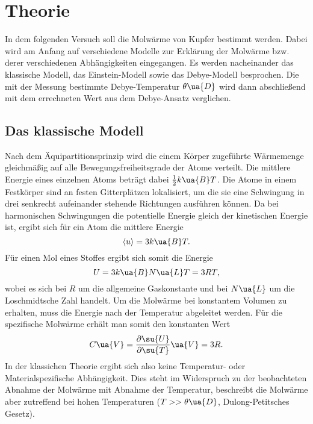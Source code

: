 \section{Theorie}

In dem folgenden Versuch soll die Molwärme von Kupfer bestimmt werden. Dabei wird
am Anfang auf verschiedene Modelle zur Erklärung der Molwärme bzw. derer verschiedenen
Abhängigkeiten eingegangen. Es werden nacheinander das klassische Modell, das Einstein-Modell
sowie das Debye-Modell besprochen. Die mit der Messung bestimmte Debye-Temperatur
$\theta\ua{D}$ wird dann abschließend mit dem errechneten Wert aus dem Debye-Ansatz
verglichen.

\subsection{Das klassische Modell}

Nach dem Äquipartitionsprinzip wird die einem Körper zugeführte Wärmemenge
gleichmäßig auf alle Bewegungsfreiheitsgrade der Atome verteilt. Die mittlere
Energie eines einzelnen Atoms beträgt dabei $\frac{1}{2}k\ua{B}T$. Die Atome in
einem Festkörper sind an festen Gitterplätzen lokalisiert, um die sie eine Schwingung
in drei senkrecht aufeinander stehende Richtungen ausführen können. Da bei harmonischen
Schwingungen die potentielle Energie gleich der kinetischen Energie ist, ergibt
sich für ein Atom die mittlere Energie
\begin{equation}
  \langle u \rangle = 3 k\ua{B} T.
\end{equation}
Für einen Mol eines Stoffes ergibt sich somit die Energie
\begin{equation}
  U = 3 k\ua{B} N\ua{L} T = 3 RT,
\end{equation}
wobei es sich bei $R$ um die allgemeine Gaskonstante und bei $N\ua{L}$ um die
Loschmidtsche Zahl handelt. Um die Molwärme bei konstantem Volumen zu erhalten,
muss die Energie nach der Temperatur abgeleitet werden. Für die spezifische Molwärme
erhält man somit den konstanten Wert
\begin{equation}
  C\ua{V} = \frac{\partial \su{U}}{\partial \su{T}}\ua{V} = 3R.
  \label{eqn:CVKlassisch}
\end{equation}
In der klassichen Theorie ergibt sich also keine Temperatur- oder Materialspezifische
Abhängigkeit. Dies steht im Widerspruch zu der beobachteten Abnahme der Molwärme
mit Abnahme der Temperatur, beschreibt die Molwärme aber zutreffend bei hohen Temperaturen
($T >> \theta\ua{D}$, Dulong-Petitsches Gesetz).

